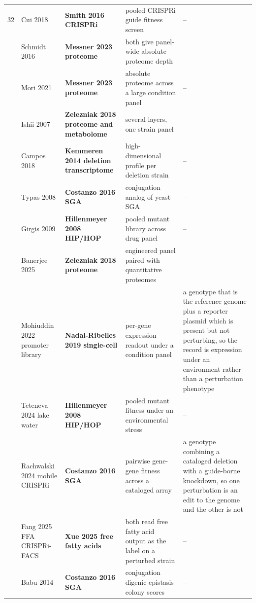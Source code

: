 \begin{landscape}
\begin{longtable}{@{}r@{\hspace{4pt}} L{40mm} L{40mm} L{74mm} L{74mm}@{}}
32 & Cui 2018  & \textbf{Smith 2016 CRISPRi} & pooled CRISPRi guide fitness screen & -- \\
 & Schmidt 2016  & \textbf{Messner 2023 proteome} & both give panel-wide absolute proteome depth & -- \\
 & Mori 2021  & \textbf{Messner 2023 proteome} & absolute proteome across a large condition panel & -- \\
 & Ishii 2007  & \textbf{Zelezniak 2018 proteome and metabolome} & several layers, one strain panel & -- \\
 & Campos 2018  & \textbf{Kemmeren 2014 deletion transcriptome} & high-dimensional profile per deletion strain & -- \\
 & Typas 2008  & \textbf{Costanzo 2016 SGA} & conjugation analog of yeast SGA & -- \\
 & Girgis 2009  & \textbf{Hillenmeyer 2008 HIP/HOP} & pooled mutant library across drug panel & -- \\
 & Banerjee 2025  & \textbf{Zelezniak 2018 proteome} & engineered panel paired with quantitative proteomes & -- \\
 & Mohiuddin 2022 promoter library  & \textbf{Nadal-Ribelles 2019 single-cell} & per-gene expression readout under a condition panel & a genotype that is the reference genome plus a reporter plasmid which is present but not perturbing, so the record is expression under an environment rather than a perturbation phenotype \\
 & Teteneva 2024 lake water  & \textbf{Hillenmeyer 2008 HIP/HOP} & pooled mutant fitness under an environmental stress & -- \\
 & Rachwalski 2024 mobile CRISPRi  & \textbf{Costanzo 2016 SGA} & pairwise gene-gene fitness across a cataloged array & a genotype combining a cataloged deletion with a guide-borne knockdown, so one perturbation is an edit to the genome and the other is not \\
 & Fang 2025 FFA CRISPRi-FACS  & \textbf{Xue 2025 free fatty acids} & both read free fatty acid output as the label on a perturbed strain & -- \\
 & Babu 2014  & \textbf{Costanzo 2016 SGA} & conjugation digenic epistasis colony scores & -- \\

\end{longtable}
\end{landscape}
